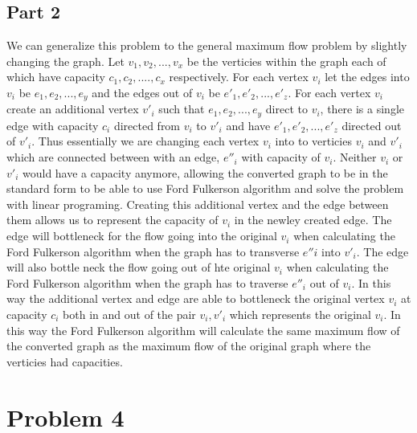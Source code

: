 \documentclass[11pt]{article}
\begin{document}
\subsection*{Part 2}
We can generalize this problem to the general maximum flow problem by slightly changing the graph. Let $v_1, v_2, ..., v_x$ be the verticies within the graph each of which have capacity $c_1, c_2, ...., c_x$ respectively. For each vertex $v_i$ let the edges into $v_i$ be $e_1, e_2, ..., e_y$ and the edges out of $v_i$ be $e'_1, e'_2, ..., e'_z$. For each vertex $v_i$ create an additional vertex $v'_i$ such that $e_1, e_2, ..., e_y$ direct to $v_i$, there is a single edge with capacity $c_i$ directed from $v_i$ to $v'_i$ and have $e'_1, e'_2, ..., e'_z$ directed out of $v'_i$. Thus essentially we are changing each vertex $v_i$ into to verticies $v_i$ and $v'_i$ which are connected between with an edge, $e''_i$ with capacity of $v_i$.  Neither $v_i$ or $v'_i$ would have a capacity anymore, allowing the converted graph to be in the standard form to be able to use Ford Fulkerson algorithm and solve the problem with linear programing. Creating this additional vertex and the edge between them allows us to represent the capacity of $v_i$ in the newley created edge. The edge will bottleneck for the flow going into the original $v_i$ when calculating the Ford Fulkerson algorithm when the graph has to transverse $e''i$ into $v'_i$. The edge will also bottle neck the flow going out of hte original $v_i$ when calculating the Ford Fulkerson algorithm when the graph has to traverse $e''_i$ out of $v_i$. In this way the additional vertex and edge are able to bottleneck the original vertex $v_i$ at capacity $c_i$ both in and out of the pair $v_i, v'_i$ which represents the original $v_i$. In this way the Ford Fulkerson algorithm will calculate the same maximum flow of the converted graph as the maximum flow of the original graph where the verticies had capacities.

\section*{Problem 4}
\end{document}
